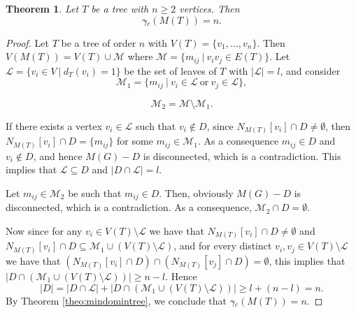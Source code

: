 \documentclass[a4paper,12pt, reqno]{amsart}
\newtheorem{Theorem}{Theorem}[section]
\begin{document}
\begin{Theorem}\label{theo:outmindomintreeneqstar}
	Let $T$ be a tree with $n\ge2$ vertices. Then $$\gamma{\tilde{}} _{c}(M(T))= n.$$
\end{Theorem}
\begin{proof}
 Let $T$ be a tree of order $n$ with $V(T)=\{v_1, \dots, v_n\}$. Then $V(M(T))=V(T) \cup \mathcal{M}$ where $\mathcal{M}=\{m_{ij}~|~ v_iv_j\in E(T)\}$. %
 Let $\mathcal{L}=\{v_i \in V ~|~d_{T}(v_i)=1\}$ be the set of leaves of $T$ with $|\mathcal{L}|=l$, and consider
 \[
 \mathcal{M}_{1}=\{m_{ij}~|~ v_i \in \mathcal{L}~ \mbox{or}~ v_j \in \mathcal{L}\},
 \]
 
 \[
 \mathcal{M}_{2}=\mathcal{M} \setminus \mathcal{M}_{1}.
 \]

If there exists a vertex $v_i \in \mathcal{L}$ such that $v_i \notin D$, since $ N_{M(T)}[v_i]\cap D\neq \emptyset$, then $ N_{M(T)}[v_i]\cap D=\{m_{ij}\}$ for some $m_{ij} \in \mathcal{M}_{1}$. As a consequence $m_{ij} \in D$ and $v_i \notin D$, and hence $M(G)-D$ is disconnected, which is a contradiction. This implies that $\mathcal{L} \subseteq D$ and $|D \cap \mathcal{L}|=l$.

 Let $m_{ij} \in \mathcal{M}_{2}$ be such that $m_{ij} \in D$. Then, obviously  $M(G)-D$ is disconnected, which is a contradiction. As a consequence, $\mathcal{M}_{2} \cap D=\emptyset$.
 
 Now since for any $v_i \in V(T) \setminus \mathcal{L}$ we have that $ N_{M(T)}[v_i]\cap D\neq \emptyset$ and $N_{M(T)}[v_i]\cap D \subseteq \mathcal{M}_{1} \cup (V(T) \setminus \mathcal{L})$, and for every distinct $v_i, v_j \in V(T) \setminus \mathcal{L}$ we have that $(N_{M(T)}[v_i]\cap D) \cap (N_{M(T)}[v_j]\cap D)=\emptyset $, this implies that $|D \cap (\mathcal{M}_{1} \cup (V(T) \setminus \mathcal{L}))| \geq n-l$. Hence $$|D|=|D \cap \mathcal{L}|+|D \cap (\mathcal{M}_{1} \cup (V(T) \setminus \mathcal{L}))| \geq l+(n-l)=n.$$
By Theorem \ref{theo:mindomintree}, we conclude that $\gamma{\tilde{}} _{c}(M(T))= n.$


\end{proof}
\end{document}
